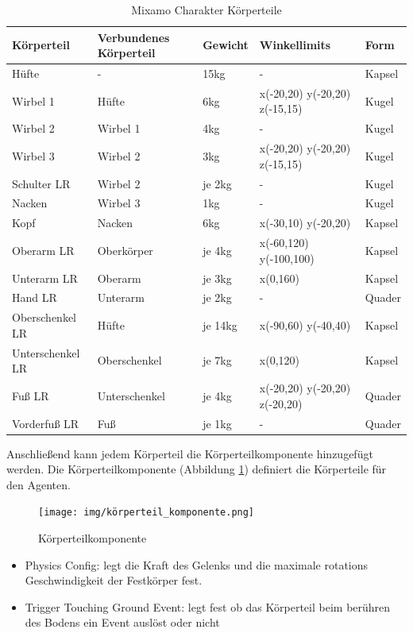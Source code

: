 \begin{table}[H]
  \centering
  {
  \begin{tabular}{ |p{3cm}|p{3cm}|p{2cm}|p{4cm}|p{2cm}| }
  \hline
  \textbf{Körpertei}l& \textbf{Verbundenes Körperteil} & \textbf{Gewicht} & \textbf{Winkellimits} & \textbf{Form} \\
  \hline
  Hüfte & - & 15kg & - & Kapsel \\
  \hline
  Wirbel 1 & Hüfte & 6kg & x(-20,20) y(-20,20) z(-15,15) & Kugel \\
  \hline
  Wirbel 2 & Wirbel 1 & 4kg & - & Kugel \\
  \hline
  Wirbel 3 & Wirbel 2 & 3kg & x(-20,20) y(-20,20) z(-15,15) & Kugel \\
  \hline
  Schulter LR & Wirbel 2 & je 2kg& - & Kugel \\
  \hline
  Nacken & Wirbel 3 & 1kg & - & Kugel \\
  \hline
  Kopf & Nacken & 6kg & x(-30,10) y(-20,20) & Kapsel \\
  \hline
  Oberarm LR & Oberkörper & je 4kg & x(-60,120) y(-100,100) & Kapsel \\
  \hline
  Unterarm LR & Oberarm & je 3kg & x(0,160) & Kapsel \\
  \hline
  Hand LR & Unterarm & je 2kg & - & Quader \\
  \hline
  Oberschenkel LR & Hüfte & je 14kg& x(-90,60) y(-40,40) & Kapsel \\
  \hline
  Unterschenkel LR & Oberschenkel & je 7kg &  x(0,120) & Kapsel \\
  \hline
  Fuß LR & Unterschenkel & je 4kg & x(-20,20) y(-20,20) z(-20,20) & Quader \\
  \hline
  Vorderfuß LR & Fuß & je 1kg & - & Quader \\
  \hline
  \end{tabular}}
  \caption{Mixamo Charakter Körperteile}
  \label{table:mixamo_körperteile}
\end{table}

Anschließend kann jedem Körperteil die Körperteilkomponente hinzugefügt werden. Die Körperteilkomponente (Abbildung \ref{fig:körperteil_komponente}) definiert die Körperteile für den Agenten.
\begin{figure}[H]
  \centering  
  \texttt{[image: img/körperteil\_komponente.png]}
  \caption{Körperteilkomponente}
  \label{fig:körperteil_komponente}
\end{figure}

\begin{itemize}
  \item Physics Config: legt die Kraft des Gelenks und die maximale rotations Geschwindigkeit der Festkörper fest.
  \item Trigger Touching Ground Event: legt fest ob das Körperteil beim berühren des Bodens ein Event auslöst oder nicht
\end{itemize}

